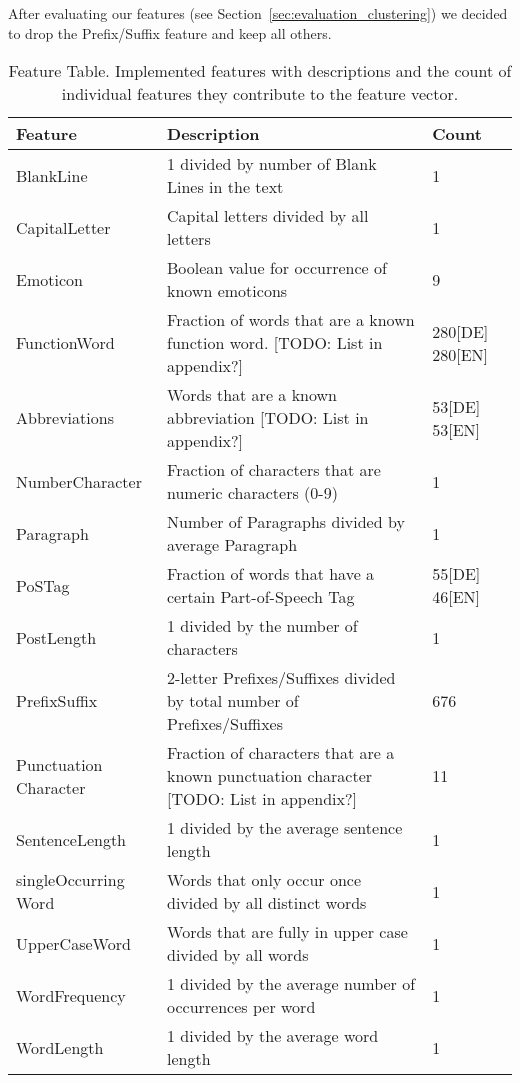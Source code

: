 After evaluating our features (see Section~\ref{sec:evaluation_clustering}) we decided to drop the Prefix/Suffix feature and keep all others.

\begin{table}[h]
    \begin{center}
    \begin{tabular}{p{2.6cm}|p{8.2cm}|p{1.2cm}}
    Feature					& Description																	& Count				\\ \hline
    BlankLine				& 1 divided by number of Blank Lines in the text								& 1					\\ \hline
    CapitalLetter			& Capital letters divided by all letters										& 1					\\ \hline
    Emoticon				& Boolean value for occurrence of known emoticons								& 9					\\ \hline
    FunctionWord			& Fraction of words that are a known function word. [TODO: List in appendix?]	& 280[DE] 280[EN]	\\ \hline
    Abbreviations			& Words that are a known abbreviation [TODO: List in appendix?]					& 53[DE] 53[EN]		\\ \hline
    NumberCharacter			& Fraction of characters that are numeric characters (0-9)						& 1					\\ \hline
    Paragraph				& Number of Paragraphs divided by average Paragraph								& 1					\\ \hline
    PoSTag					& Fraction of words that have a certain Part-of-Speech Tag                      & 55[DE] 46[EN]  	\\ \hline
    PostLength				& 1 divided by the number of characters											& 1					\\ \hline
    PrefixSuffix			& 2-letter Prefixes/Suffixes divided by total number of Prefixes/Suffixes		& 676 			 	\\ \hline
    Punctuation Character	& Fraction of characters that are a known punctuation character [TODO: List in appendix?]
                                                                                                            & 11				\\ \hline
    SentenceLength			& 1 divided by the average sentence length										& 1 				\\ \hline
    singleOccurring Word	& Words that only occur once divided by all distinct words						& 1					\\ \hline
    UpperCaseWord			& Words that are fully in upper case divided by all words						& 1					\\ \hline
    WordFrequency			& 1 divided by the average number of occurrences per word						& 1					\\ \hline
    WordLength				& 1 divided by the average word length											& 1					\\
    \end{tabular}
    \end{center}
	\caption{Feature Table. Implemented features with descriptions and the count of individual features they contribute to the feature vector.}
	\label{tab:featureTable}
\end{table}
